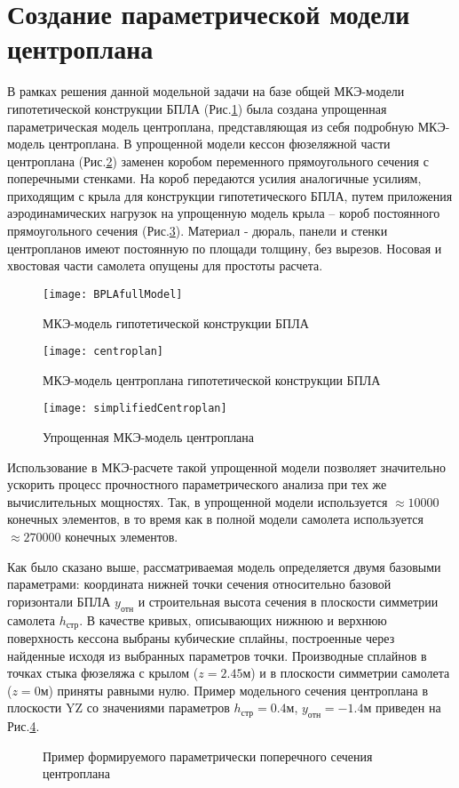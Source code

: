 \section{Создание параметрической модели центроплана}
\label{sec:creationOfModel}

В рамках решения данной модельной задачи на базе общей МКЭ-модели гипотетической конструкции БПЛА (Рис.\ref{fig:fullMKE}) была создана упрощенная параметрическая модель центроплана, представляющая из себя подробную МКЭ-модель центроплана. В упрощенной модели кессон фюзеляжной части центроплана (Рис.\ref{fig:centroplanMKE}) заменен коробом переменного прямоугольного сечения с поперечными стенками. На короб передаются усилия аналогичные усилиям, приходящим с крыла для конструкции гипотетического БПЛА, путем приложения аэродинамических нагрузок на упрощенную модель крыла -- короб постоянного прямоугольного сечения (Рис.\ref{fig:simplifiedCentroplanMKE}). Материал - дюраль, панели и стенки центропланов имеют постоянную по площади толщину, без вырезов. Носовая и хвостовая части самолета опущены для простоты расчета.  


\begin{figure}[ht]
\centering 
\texttt{[image: BPLAfullModel]}
\caption{МКЭ-модель гипотетической конструкции БПЛА}
\label{fig:fullMKE}
\end{figure}

\begin{figure}[ht]
\centering 
\texttt{[image: centroplan]}
\caption{МКЭ-модель центроплана гипотетической конструкции БПЛА}
\label{fig:centroplanMKE}
\end{figure}

\begin{figure}[ht]
\centering
\texttt{[image: simplifiedCentroplan]}
\caption{Упрощенная МКЭ-модель центроплана}
\label{fig:simplifiedCentroplanMKE}
\end{figure}

Использование в МКЭ-расчете такой упрощенной модели позволяет значительно ускорить процесс прочностного параметрического анализа при тех же вычислительных мощностях. Так, в упрощенной модели используется $\approx10000$ конечных элементов, в то время как в полной модели самолета используется $\approx270000$ конечных элементов.

Как было сказано выше, рассматриваемая модель определяется двумя базовыми параметрами: координата нижней точки сечения относительно базовой горизонтали БПЛА $y_\text{отн}$ и строительная высота сечения в плоскости симметрии самолета $h_\text{стр}$. В качестве кривых, описывающих нижнюю и верхнюю поверхность кессона выбраны кубические сплайны, построенные через найденные исходя из выбранных параметров точки. Производные сплайнов в точках стыка фюзеляжа с крылом ($z=2.45\text{м}$) и в плоскости симметрии самолета ($z=0\text{м}$) приняты равными нулю. Пример модельного сечения центроплана в плоскости YZ со значениями параметров $h_\text{стр}=0.4\text{м}$, $y_\text{отн} = -1.4\text{м}$ приведен на Рис.\ref{fig:KessSectionExample}.

\begin{figure}[ht]
\centering
\def\svgwidth{\textwidth}

\caption{Пример формируемого параметрически поперечного сечения центроплана}
\label{fig:KessSectionExample}
\end{figure}

